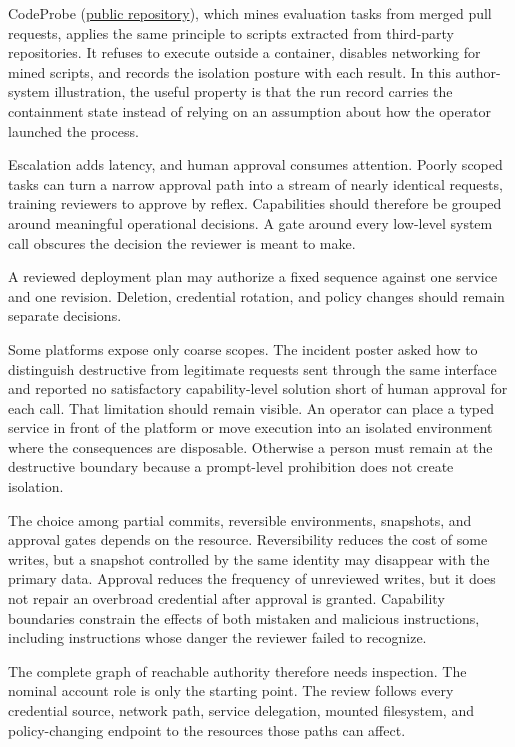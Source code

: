 CodeProbe (\href{https://github.com/sjarmak/codeprobe}{public repository}), which mines evaluation tasks from merged pull requests, applies the same principle to scripts extracted from third-party repositories. It refuses to execute outside a container, disables networking for mined scripts, and records the isolation posture with each result. In this author-system illustration, the useful property is that the run record carries the containment state instead of relying on an assumption about how the operator launched the process.

Escalation adds latency, and human approval consumes attention. Poorly scoped tasks can turn a narrow approval path into a stream of nearly identical requests, training reviewers to approve by reflex. Capabilities should therefore be grouped around meaningful operational decisions. A gate around every low-level system call obscures the decision the reviewer is meant to make.

A reviewed deployment plan may authorize a fixed sequence against one service and one revision. Deletion, credential rotation, and policy changes should remain separate decisions.

Some platforms expose only coarse scopes. The incident poster asked how to distinguish destructive from legitimate requests sent through the same interface and reported no satisfactory capability-level solution short of human approval for each call. That limitation should remain visible. An operator can place a typed service in front of the platform or move execution into an isolated environment where the consequences are disposable. Otherwise a person must remain at the destructive boundary because a prompt-level prohibition does not create isolation.

The choice among partial commits, reversible environments, snapshots, and approval gates depends on the resource. Reversibility reduces the cost of some writes, but a snapshot controlled by the same identity may disappear with the primary data. Approval reduces the frequency of unreviewed writes, but it does not repair an overbroad credential after approval is granted. Capability boundaries constrain the effects of both mistaken and malicious instructions, including instructions whose danger the reviewer failed to recognize.

The complete graph of reachable authority therefore needs inspection. The nominal account role is only the starting point. The review follows every credential source, network path, service delegation, mounted filesystem, and policy-changing endpoint to the resources those paths can affect.

